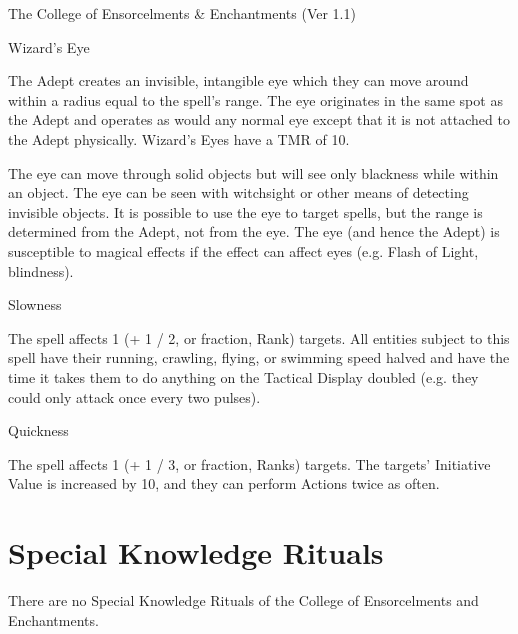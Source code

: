 \begin{Chapter}{The College of Ensorcelments \& Enchantments (Ver 1.1)}
\begin{spell}[S-10]{Wizard’s Eye}
\begin{effects}
The Adept creates an invisible, intangible eye which they can move
around within a radius equal to the spell’s range. The eye originates
in the same spot as the Adept and operates as would any normal eye
except that it is not attached to the Adept physically.  Wizard’s Eyes
have a TMR of 10.

The eye can move through solid objects but will see only blackness
while within an object. The eye can be seen with witchsight or other
means of detecting invisible objects. It is possible to use the eye to
target spells, but the range is determined from the Adept, not from
the eye.  The eye (and hence the Adept) is susceptible to magical
effects if the effect can affect eyes (e.g.  Flash of Light,
blindness).
\end{effects}
\end{spell}

\begin{spell}[S-11]{Slowness}

\begin{effects}
The spell affects 1 (+ 1 / 2, or fraction, Rank) targets.  All
entities subject to this spell have their running, crawling, flying,
or swimming speed halved and have the time it takes them to do
anything on the Tactical Display doubled (e.g.  they could only attack
once every two pulses).
\end{effects}
\end{spell}

\begin{spell}[S-12]{Quickness}

\begin{effects}
The spell affects 1 (+ 1 / 3, or fraction, Ranks) targets.  The
targets’ Initiative Value is increased by 10, and they can perform
Actions twice as often.
\end{effects}
\end{spell}


\section{Special Knowledge Rituals}

There are no Special Knowledge Rituals of the College of Ensorcelments
and Enchantments.

\end{Chapter}
